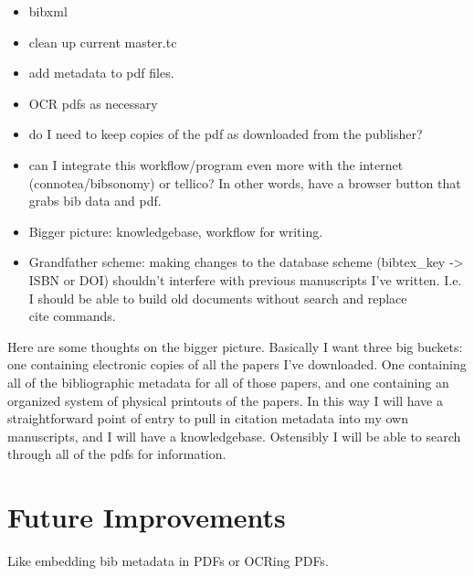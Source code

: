 \documentclass[letterpaper,12pt]{article}
\begin{document}
\begin{itemize}
\item bibxml
\item clean up current master.tc
\item add metadata to pdf files.
\item OCR pdfs as necessary
\item do I need to keep copies of the pdf as downloaded from the publisher?
\item can I integrate this workflow/program even more with the internet (connotea/bibsonomy) or tellico? In other words, have a browser button that grabs bib data and pdf.
\item Bigger picture: knowledgebase, workflow for writing.
\item Grandfather scheme: making changes to the database scheme (bibtex\_key -> ISBN or DOI) shouldn't interfere with previous manuscripts I've written. I.e. I should be able to build old documents without search and replace \\cite commands.
\end{itemize}

Here are some thoughts on the bigger picture. Basically I want three big buckets: one containing electronic copies of all the papers I've downloaded. One containing all of the bibliographic metadata for all of those papers, and one containing an organized system of physical printouts of the papers. In this way I will have a straightforward point of entry to pull in citation metadata into my own manuscripts, and I will have a knowledgebase. Ostensibly I will be able to search through all of the pdfs for information.






\section{Future Improvements}
Like embedding bib metadata in PDFs or OCRing PDFs.
\end{document}
